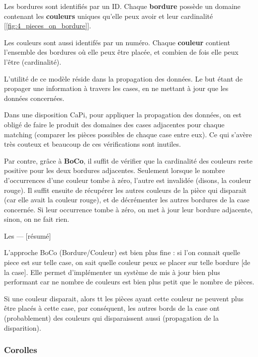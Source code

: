 	Les bordures sont identifiés par un ID. Chaque \textbf{bordure} possède un domaine contenant les \textbf{couleurs} uniques qu'elle peux avoir et leur cardinalité [\autoref{fig:4_pieces_on_bordure}].
	
	Les couleurs sont aussi identifés par un numéro. Chaque \textbf{couleur} contient l'ensemble des bordures où elle peux être placée, et combien de fois elle peux l'être (cardinalité).
	
	L'utilité de ce modèle réside dans la propagation des données. Le but étant de propager une information à travers les cases, en ne mettant à jour que les données concernées.
	
	Dans une disposition CaPi, pour appliquer la propagation des données, on est obligé de faire le produit des domaines des cases adjacentes pour chaque matching (comparer les pièces possibles de chaque case entre eux). Ce qui s'avère très couteux et beaucoup de ces vérifications sont inutiles.
	
	Par contre, grâce à \textbf{BoCo}, il suffit de vérifier que la cardinalité des couleurs reste positive pour les deux bordures adjacentes. Seulement lorsque le nombre d'occurrences d'une couleur tombe à zéro, l'autre est invalidée (disons, la couleur rouge). Il suffit ensuite de récupérer les autres couleurs de la pièce qui disparait (car elle avait la couleur rouge), et de décrémenter les autres bordures de la case concernée. Si leur occurrence tombe à zéro, on met à jour leur bordure adjacente, sinon, on ne fait rien.

	Les 
	--- [résumé]

	L'approche BoCo (Bordure/Couleur) est bien plus fine : si l'on connait quelle piece est sur telle case, on sait quelle couleur peux se placer sur telle bordure [de la case]. Elle permet d'implémenter un système de mis à jour bien plus performant car ne nombre de couleurs est bien plus petit que le nombre de pièces.

	\begin{exmp}
		Si une couleur disparait, alors tt les pièces ayant cette couleur ne peuvent plus être placés à cette case, par conséquent, les autres bords de la case ont (probablement) des couleurs qui disparaissent aussi (propagation de la disparition).
	\end{exmp}

	\subsubsection{Corolles}


